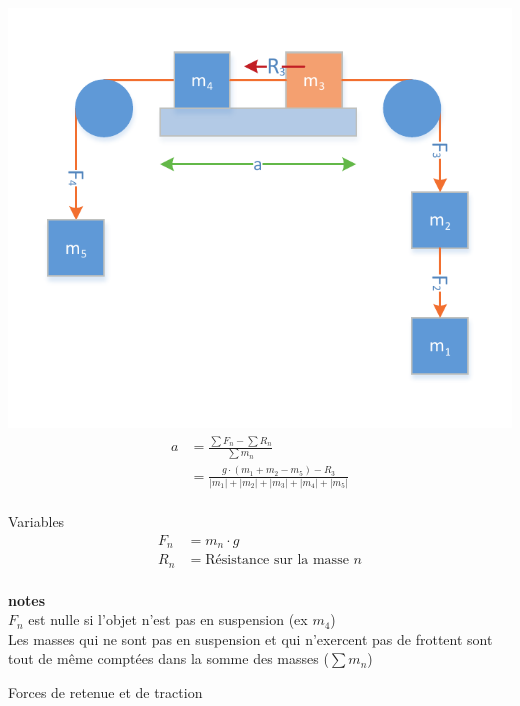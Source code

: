 \documentclass[12pt,a4paper]{article} %
\begin{document}
\begin{twocols}[0.5][0.5]
	\includegraphics[width=1\textwidth]{Newton-Poulies}
\nextcol
	\begin{align*}
		a &= \frac{\sum F_n - \sum R_n}{\sum m_n} \\
		  &= \frac{g\cdot(m_1+m_2-m_5) - R_3}{|m_1|+|m_2|+|m_3|+|m_4|+|m_5|} \\
	\end{align*}
	\par\vspace{0.2em}
	Variables \\
	\begin{align*}
		F_n &= m_n \cdot g \\
		R_n &= \text{Résistance sur la masse $n$} \\
	\end{align*}
	\par\vspace{0.2em}
	{\small
	\textbf{notes} \\
	$F_n$ est nulle si l'objet n'est pas en suspension (ex $m_4$) \\
	Les masses qui ne sont pas en suspension et qui n'exercent pas de frottent sont tout de même comptées dans la somme des masses ($\sum m_n$)
	}

\end{twocols}
Forces de retenue et de traction \\
\end{document}
